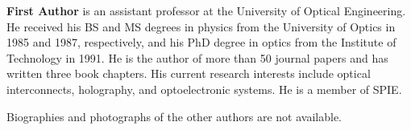 \documentclass[12pt]{spieman}  %
\begin{document}
\begin{spacing}{2}
\vspace{2ex}\noindent\textbf{First Author} is an assistant professor at the University of Optical Engineering. He received his BS and MS degrees in physics from the University of Optics in 1985 and 1987, respectively, and his PhD degree in optics from the Institute of Technology in 1991.  He is the author of more than 50 journal papers and has written three book chapters. His current research interests include optical interconnects, holography, and optoelectronic systems. He is a member of SPIE.

\vspace{1ex}
\noindent Biographies and photographs of the other authors are not available.

\listoffigures
\listoftables

\end{spacing}
\end{document}
